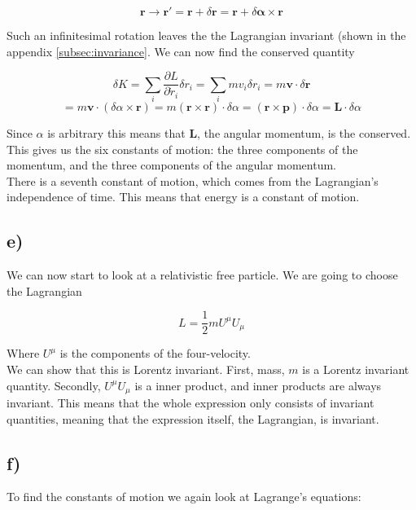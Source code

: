 \documentclass[a4paper,norsk, 10pt]{article}
\begin{document}
$$
\mathbf{r} \rightarrow \mathbf{r}' = \mathbf{r} + \delta\mathbf{r} = \mathbf{r} + \delta\mathbf{\alpha}\times \mathbf{r}
$$

Such an infinitesimal rotation leaves the the Lagrangian invariant (shown in the appendix \ref{subsec:invariance}. We can now find the conserved quantity

$$
\delta K = \sum_i \frac{\partial L}{\partial \dot{r}_i}\delta r_i = \sum_i mv_i \delta r_i = m\mathbf{v}\cdot\delta\mathbf{r}
$$
$$
= m\mathbf{v}\cdot (\delta\alpha\times \mathbf{r}) = m(\mathbf{r}\times \mathbf{r}) \cdot \delta \alpha = (\mathbf{r}\times \mathbf{p})\cdot\delta\alpha = \mathbf{L}\cdot\delta\alpha
$$

Since $\alpha$ is arbitrary this means that $\mathbf{L}$, the angular momentum, is the conserved.\\

This gives us the six constants of motion: the three components of the momentum, and the three components of the angular momentum.\\

There is a seventh constant of motion, which comes from the Lagrangian's independence of time. This means that energy is a constant of motion.

\subsection*{e)}

We can now start to look at a relativistic free particle. We are going to choose the Lagrangian

\begin{equation}
L = \frac{1}{2}mU^{\mu}U_{\mu}
\label{eq:relativisticLagrangian}
\end{equation}

Where $U^{\mu}$ is the components of the four-velocity.\\

We can show that this is Lorentz invariant. First, mass, $m$ is a Lorentz invariant quantity. Secondly, $U^{\mu}U_{\mu}$ is a inner product, and inner products are always invariant. This means that the whole expression only consists of invariant quantities, meaning that the expression itself, the Lagrangian, is invariant.

\subsection*{f)}

To find the constants of motion we again look at Lagrange's equations:
\end{document}
